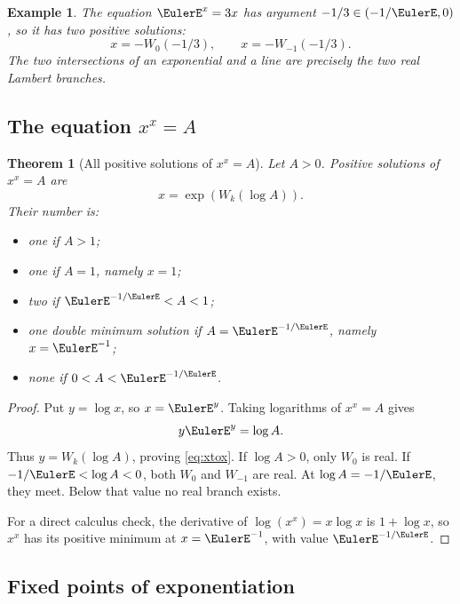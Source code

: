 \documentclass[11pt]{article}
\newtheorem{theorem}{Theorem}[section]
\newtheorem{example}[example]{Example}
\theoremstyle{remark}
\begin{document}
\begin{example}
The equation \(\EulerE^x=3x\) has argument \(-1/3\in(-1/\EulerE,0)\), so it has
two positive solutions:
\[
       x=-W_0(-1/3),\qquad x=-W_{-1}(-1/3).
\]
The two intersections of an exponential and a line are precisely the two
real Lambert branches.
\end{example}

\subsection{The equation \texorpdfstring{\(x^x=A\)}{x to the x equals A}}

\begin{theorem}[All positive solutions of \(x^x=A\)]\label{thm:xtox}
Let \(A>0\).  Positive solutions of \(x^x=A\) are
\begin{equation}\label{eq:xtox}
       x=\exp(W_k(\log A)).
\end{equation}
Their number is:
\begin{itemize}
\item one if \(A>1\);
\item one if \(A=1\), namely \(x=1\);
\item two if \(\EulerE^{-1/\EulerE}<A<1\);
\item one double minimum solution if \(A=\EulerE^{-1/\EulerE}\), namely
\(x=\EulerE^{-1}\);
\item none if \(0<A<\EulerE^{-1/\EulerE}\).
\end{itemize}
\end{theorem}

\begin{proof}
Put \(y=\log x\), so \(x=\EulerE^y\).  Taking logarithms of \(x^x=A\) gives
\[
       y\EulerE^y=\log A.
\]
Thus \(y=W_k(\log A)\), proving \eqref{eq:xtox}.  If \(\log A>0\), only
\(W_0\) is real.  If \(-1/\EulerE<\log A<0\), both \(W_0\) and \(W_{-1}\)
are real.  At \(\log A=-1/\EulerE\), they meet.  Below that value no real branch
exists.

For a direct calculus check, the derivative of
\(\log(x^x)=x\log x\) is \(1+\log x\), so \(x^x\) has its positive minimum
at \(x=\EulerE^{-1}\), with value \(\EulerE^{-1/\EulerE}\).
\end{proof}

\subsection{Fixed points of exponentiation}
\end{document}
